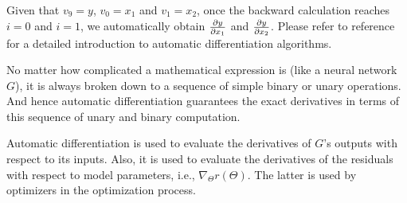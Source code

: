 Given that $v_9=y$, $v_0=x_1$ and $v_1=x_2$, once the backward calculation reaches $i=0$ and $i=1$, we automatically obtain $\frac{\partial y}{\partial x_1}$ and $\frac{\partial y}{\partial x_2}$.
Please refer to reference~\cite{griewank_automatic_1988} for a detailed introduction to automatic differentiation algorithms.

No matter how complicated a mathematical expression is (like a neural network $G$), it is always broken down to a sequence of simple binary or unary operations.
And hence automatic differentiation guarantees the exact derivatives in terms of this sequence of unary and binary computation.

Automatic differentiation is used to evaluate the derivatives of $G$'s outputs with respect to its inputs.
Also, it is used to evaluate the derivatives of the residuals with respect to model parameters, i.e., $\nabla_{\Theta} r(\Theta)$.
The latter is used by optimizers in the optimization process.

